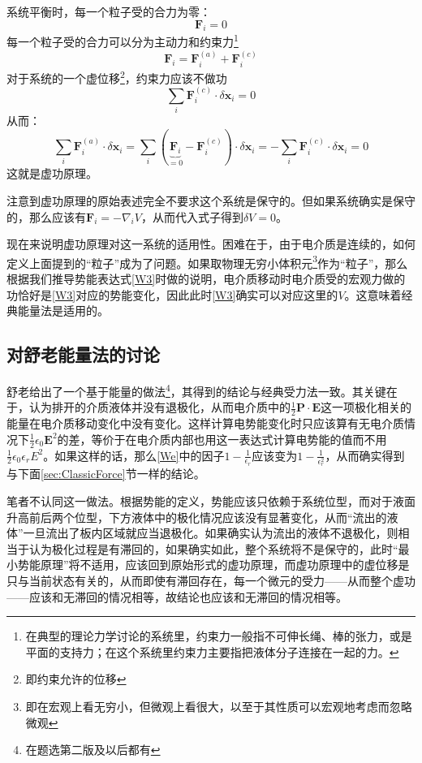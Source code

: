 \documentclass{ctexart}
\newcommand{\epsz}{\epsilon_0}
\newcommand{\epsr}{\epsilon_r}
\begin{document}
	系统平衡时，每一个粒子受的合力为零：
	\begin{equation}
	\mathbf F_i=0
	\end{equation}
	每一个粒子受的合力可以分为主动力和约束力\footnote{在典型的理论力学讨论的系统里，约束力一般指不可伸长绳、棒的张力，或是平面的支持力；在这个系统里约束力主要指把液体分子连接在一起的力。}
	\begin{equation}
	\mathbf F_i=\mathbf F^{(a)}_i+\mathbf F^{(c)}_i
	\end{equation}
	对于系统的一个虚位移\footnote{即约束允许的位移}，约束力应该不做功
	\begin{equation}
	\sum_i \mathbf F^{(c)}_i\cdot\delta\mathbf x_i=0
	\end{equation}
	从而：
	\begin{equation}
	\sum_i\mathbf F^{(a)}_i\cdot\delta\mathbf x_i=\sum_i(\underbrace{\mathbf F_i}_{=0}-\mathbf F^{(c)}_i)\cdot\delta\mathbf x_i=-\sum_i \mathbf F^{(c)}_i\cdot\delta\mathbf x_i=0
	\end{equation}
	这就是虚功原理。
	
	注意到虚功原理的原始表述完全不要求这个系统是保守的。但如果系统确实是保守的，那么应该有$\mathbf F_i=-\nabla_i V$，从而代入式子得到$\delta V=0$。
	
	现在来说明虚功原理对这一系统的适用性。困难在于，由于电介质是连续的，如何定义上面提到的“粒子”成为了问题。如果取物理无穷小体积元\footnote{即在宏观上看无穷小，但微观上看很大，以至于其性质可以宏观地考虑而忽略微观}作为“粒子”，那么根据我们推导势能表达式\eqref{W3}时做的说明，电介质移动时电介质受的宏观力做的功恰好是\eqref{W3}对应的势能变化，因此此时\eqref{W3}确实可以对应这里的$V$。这意味着经典能量法是适用的。
	
	\subsection{对舒老能量法的讨论}
	
	舒老给出了一个基于能量的做法\footnote{在题选第二版及以后都有}，其得到的结论与经典受力法一致。其关键在于，认为排开的介质液体并没有退极化，从而电介质中的$\frac{1}{2}\mathbf P\cdot\mathbf E$这一项极化相关的能量在电介质移动变化中没有变化。这样计算电势能变化时只应该算有无电介质情况下$\frac{1}{2}\epsz \mathbf E^2$的差，等价于在电介质内部也用这一表达式计算电势能的值而不用$\frac{1}{2}\epsz\epsr E^2$。如果这样的话，那么\eqref{We}中的因子$1-\frac{1}{\epsr}$应该变为$1-\frac{1}{\epsr^2}$，从而确实得到与下面\ref{sec:ClassicForce}节一样的结论。
	
	笔者不认同这一做法。根据势能的定义，势能应该只依赖于系统位型，而对于液面升高前后两个位型，下方液体中的极化情况应该没有显著变化，从而“流出的液体”一旦流出了板内区域就应当退极化。如果确实认为流出的液体不退极化，则相当于认为极化过程是有滞回的，如果确实如此，整个系统将不是保守的，此时“最小势能原理”将不适用，应该回到原始形式的虚功原理，而虚功原理中的虚位移是只与当前状态有关的，从而即使有滞回存在，每一个微元的受力——从而整个虚功——应该和无滞回的情况相等，故结论也应该和无滞回的情况相等。
	
\end{document}
